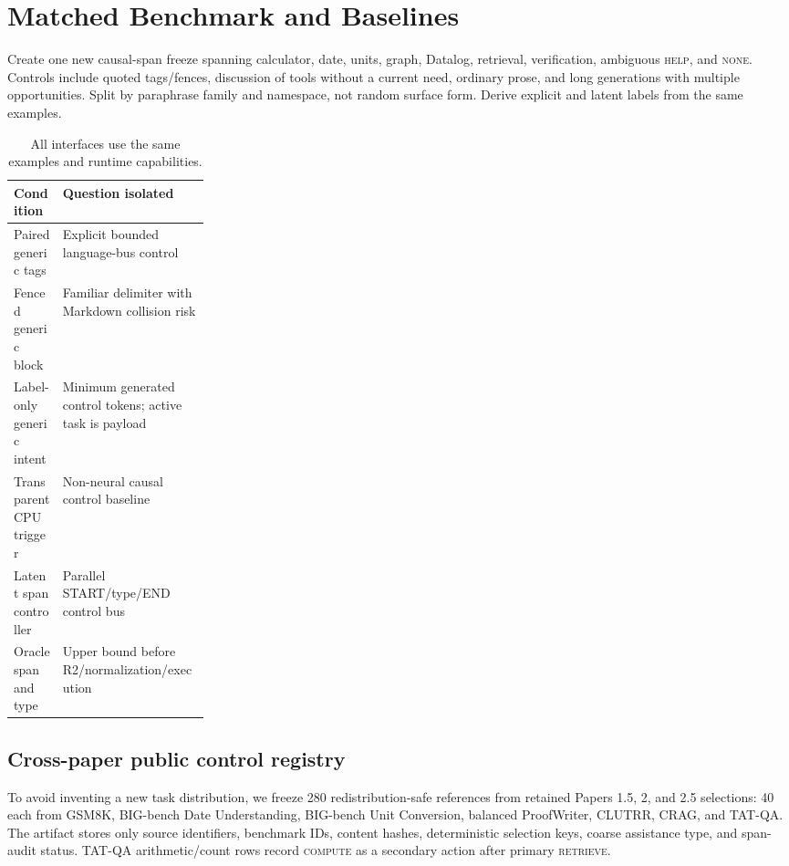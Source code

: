 \documentclass[10pt]{article}
\begin{document}
\section{Matched Benchmark and Baselines}
Create one new causal-span freeze spanning calculator, date, units, graph,
Datalog, retrieval, verification, ambiguous \textsc{help}, and \textsc{none}.
Controls include quoted tags/fences, discussion of tools without a current need,
ordinary prose, and long generations with multiple opportunities. Split by
paraphrase family and namespace, not random surface form. Derive explicit and
latent labels from the same examples.

\begin{table}[t]
\centering\small
\caption{All interfaces use the same examples and runtime capabilities.}
\begin{tabularx}{\linewidth}{@{}p{0.25\linewidth}Y@{}}
\toprule
Condition & Question isolated \\
\midrule
Paired generic tags & Explicit bounded language-bus control \\
Fenced generic block & Familiar delimiter with Markdown collision risk \\
Label-only generic intent & Minimum generated control tokens; active task is payload \\
Transparent CPU trigger & Non-neural causal control baseline \\
Latent span controller & Parallel START/type/END control bus \\
Oracle span and type & Upper bound before R2/normalization/execution \\
\bottomrule
\end{tabularx}
\end{table}

\subsection{Cross-paper public control registry}
To avoid inventing a new task distribution, we freeze 280 redistribution-safe
references from retained Papers 1.5, 2, and 2.5 selections: 40 each from GSM8K,
BIG-bench Date Understanding, BIG-bench Unit Conversion, balanced ProofWriter,
CLUTRR, CRAG, and TAT-QA. The artifact stores only source identifiers, benchmark
IDs, content hashes, deterministic selection keys, coarse assistance type, and
span-audit status. TAT-QA arithmetic/count rows record \textsc{compute} as a
secondary action after primary \textsc{retrieve}.
\end{document}
